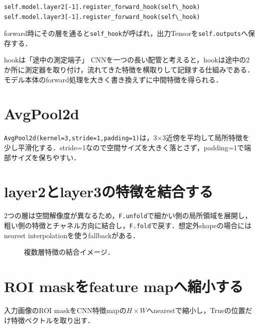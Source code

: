 \documentclass[a4paper,11pt]{ltjsreport}
\begin{document}
\begin{lstlisting}
self.model.layer2[-1].register_forward_hook(self\_hook)
self.model.layer3[-1].register_forward_hook(self\_hook)
\end{lstlisting}

forward時にその層を通ると\texttt{self\_hook}が呼ばれ，出力Tensorを\texttt{self.outputs}へ保存する．

\begin{imagebox}{hookは「途中の測定端子」}
CNNを一つの長い配管と考えると，hookは途中の2か所に測定器を取り付け，流れてきた特徴を横取りして記録する仕組みである．モデル本体のforward処理を大きく書き換えずに中間特徴を得られる．
\end{imagebox}

\section{AvgPool2d}
\texttt{AvgPool2d(kernel=3,stride=1,padding=1)}は，3×3近傍を平均して局所特徴を少し平滑化する．stride=1なので空間サイズを大きく落とさず，padding=1で端部サイズを保ちやすい．

\section{layer2とlayer3の特徴を結合する}
2つの層は空間解像度が異なるため，\texttt{F.unfold}で細かい側の局所領域を展開し，粗い側の特徴とチャネル方向に結合し，\texttt{F.fold}で戻す．想定外shapeの場合にはnearest interpolationを使うfallbackがある．

\begin{figure}[H]
\centering
{}
\caption{複数層特徴の結合イメージ．}
\end{figure}

\section{ROI maskをfeature mapへ縮小する}
入力画像のROI maskをCNN特徴mapの\(H\times W\)へnearestで縮小し，Trueの位置だけ特徴ベクトルを取り出す．
\end{document}
